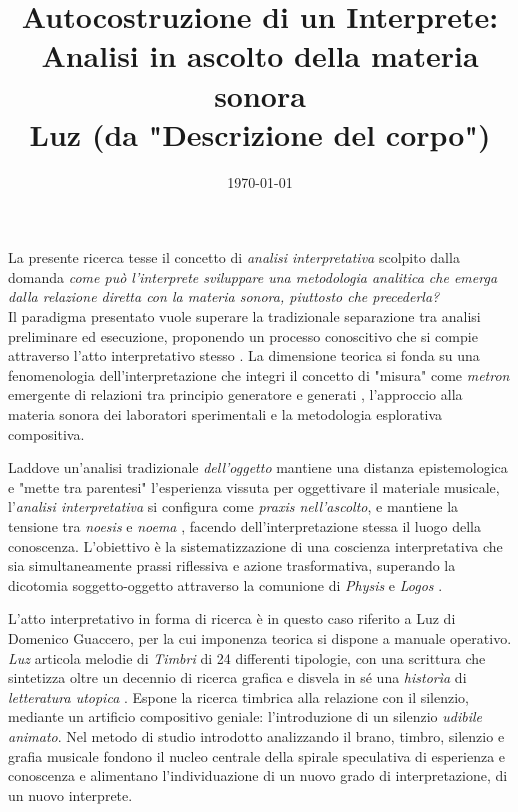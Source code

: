\documentclass[11pt]{article}
\title{\textbf{Autocostruzione di un Interprete:\\Analisi in ascolto della materia sonora\\ Luz (da "Descrizione del corpo")}}
\date{\today}
\begin{document}
\maketitle

La presente ricerca tesse il concetto di \textit{analisi interpretativa} scolpito dalla domanda \emph{come può l'interprete sviluppare una metodologia analitica che emerga dalla relazione diretta con la materia sonora, piuttosto che precederla?}\\
Il paradigma presentato vuole superare la tradizionale separazione tra analisi preliminare ed esecuzione, proponendo un processo conoscitivo che si compie attraverso l'atto interpretativo stesso \citep{hatten2021speculative}. La dimensione teorica si fonda su una fenomenologia dell'interpretazione \citep{rognoni1966fenomenologia, ihde2007listening, merleau-ponty1945phenomenologie} che integri il concetto di "misura" come \textit{metron} emergente di relazioni tra principio generatore e generati \citep{cacciari1996metafisica}, l'approccio alla materia sonora dei laboratori sperimentali e la metodologia esplorativa compositiva.

Laddove un'analisi tradizionale \emph{dell'oggetto} mantiene una distanza epistemologica e "mette tra parentesi" l'esperienza vissuta per oggettivare il materiale musicale, l'\textit{analisi interpretativa} si configura come \emph{praxis nell'ascolto}, %
e mantiene la tensione tra \emph{noesis} e \emph{noema} \citep{husserl1913ideen}, facendo dell'interpretazione stessa il luogo della conoscenza. L'obiettivo è la sistematizzazione di una coscienza interpretativa che sia simultaneamente prassi riflessiva e azione trasformativa, superando la dicotomia soggetto-oggetto attraverso la comunione di \textit{Physis} e \textit{Logos} \citep{cacciari1991labirinto}.

L'atto interpretativo in forma di ricerca è in questo caso riferito a Luz \citep{guaccero1973luz} di Domenico Guaccero, per la cui imponenza teorica
si dispone a manuale operativo. \emph{Luz} articola melodie di \emph{Timbri} di 24 differenti tipologie, con una scrittura che sintetizza oltre un decennio di ricerca grafica e disvela in sé una \emph{historìa} di \emph{letteratura utopica} \citep{bachmann1993letteratura}. Espone la ricerca timbrica alla relazione con il silenzio, mediante un artificio compositivo geniale: l'introduzione di un silenzio \emph{udibile animato}. Nel metodo di studio introdotto analizzando il brano, timbro, silenzio e grafia musicale fondono il nucleo centrale della spirale speculativa di esperienza e conoscenza e alimentano l'individuazione di un nuovo grado di interpretazione, di un nuovo interprete.
\end{document}
